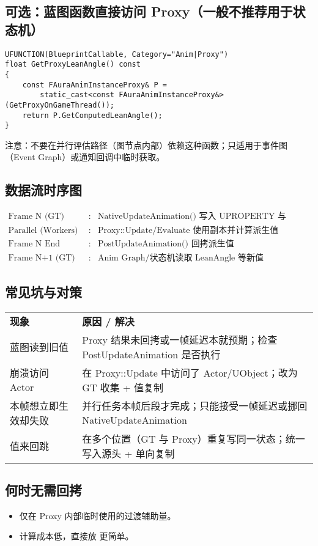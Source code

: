 \documentclass[10pt,openright,oneside,CJKmath]{MyBook}
\begin{document}
\subsection{可选：蓝图函数直接访问 Proxy（一般不推荐用于状态机）}
\begin{lstlisting}[style=cpp]
UFUNCTION(BlueprintCallable, Category="Anim|Proxy")
float GetProxyLeanAngle() const
{
    const FAuraAnimInstanceProxy& P =
        static_cast<const FAuraAnimInstanceProxy&>(GetProxyOnGameThread());
    return P.GetComputedLeanAngle();
}
\end{lstlisting}
注意：不要在并行评估路径（图节点内部）依赖这种函数；只适用于事件图（Event Graph）或通知回调中临时获取。

\subsection{数据流时序图}
\[
\begin{array}{lcl}
\text{Frame N (GT)} &: & \text{NativeUpdateAnimation() 写入 UPROPERTY 与 Proxy} \\
\text{Parallel (Workers)} &: & \text{Proxy::Update/Evaluate 使用副本并计算派生值} \\
\text{Frame N End (GT)} &: & \text{PostUpdateAnimation() 回拷派生值} \\
\text{Frame N+1 (GT)} &: & \text{Anim Graph/状态机读取 LeanAngle 等新值}
\end{array}
\]

\subsection{常见坑与对策}
\begin{tabular}{p{4cm} p{9.5cm}}
\textbf{现象} & \textbf{原因 / 解决} \\
蓝图读到旧值 & Proxy 结果未回拷或一帧延迟本就预期；检查 PostUpdateAnimation 是否执行 \\
崩溃访问 Actor & 在 Proxy::Update 中访问了 Actor/UObject；改为 GT 收集 + 值复制 \\
本帧想立即生效却失败 & 并行任务本帧后段才完成；只能接受一帧延迟或挪回 NativeUpdateAnimation \\
值来回跳 & 在多个位置（GT 与 Proxy）重复写同一状态；统一写入源头 + 单向复制 \\
\end{tabular}

\subsection{何时无需回拷}
\begin{itemize}
  \item 仅在 Proxy 内部临时使用的过渡辅助量。
  \item 计算成本低，直接放  更简单。
\end{itemize}
\end{document}
